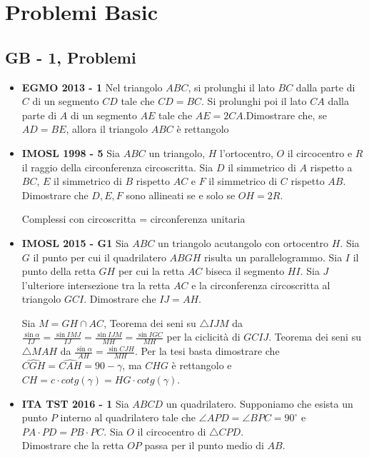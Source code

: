 \section{Problemi Basic}
\subsection{GB - 1, Problemi}
\begin{itemize}
 \item \textbf{EGMO 2013 - 1} Nel triangolo $ABC$, si prolunghi il lato $BC$ dalla parte di $C$ di un segmento $CD$ tale che $CD=BC$. Si prolunghi poi il lato $CA$ dalla parte di $A$ di un segmento $AE$ tale che $AE= 2CA$.Dimostrare che, se $AD=BE$, allora il triangolo $ABC$ è rettangolo
 
 \item \textbf{IMOSL 1998 - 5} Sia $ABC$ un triangolo, $H$ l'ortocentro, $O$ il circocentro e $R$ il raggio della circonferenza circoscritta. Sia $D$ il simmetrico di $A$ rispetto a $BC$, $E$ il simmetrico di $B$ rispetto $AC$ e $F$ il simmetrico di $C$ rispetto $AB$.\\
 Dimostrare che $D,E,F$ sono allineati se e solo se $OH=2R$.

 \begin{sol}
 Complessi con circoscritta = circonferenza unitaria
\end{sol}

 
 
 \item \textbf{IMOSL 2015 - G1} Sia $ABC$ un triangolo acutangolo con ortocentro $H$. Sia $G$ il punto per cui il quadrilatero $ABGH$ risulta un parallelogrammo. Sia $I$ il punto della retta $GH$ per cui
la retta $AC$ biseca il segmento $HI$. Sia $J$ l’ulteriore intersezione tra la retta $AC$ e la
circonferenza circoscritta al triangolo $GCI$.
Dimostrare che $IJ = AH$.

\begin{sol}
 Sia $M=GH\cap AC$, Teorema dei seni su $\triangle IJM$ da $\frac{\sin\alpha}{IJ}=\frac{\sin IMJ}{IJ}=\frac{\sin IJM}{MH}=\frac{\sin IGC}{MH}$ per la ciclicità di $GCIJ$. Teorema dei seni su $\triangle MAH$ da $\frac{\sin\alpha}{AH}=\frac{\sin CJH}{MH}$. Per la tesi basta dimostrare che $\widehat{CGH}=\widehat{CAH}=90-\gamma$, ma $CHG$ è rettangolo e $CH=c\cdot cotg(\gamma)=HG\cdot cotg(\gamma)$.
\end{sol}

\item \textbf{ITA TST 2016 - 1} Sia $ABCD$ un quadrilatero. Supponiamo che esista un punto $P$ interno al quadrilatero tale che $\angle APD = \angle BPC = 90^{\circ}$ e $PA \cdot PD = PB \cdot PC$. Sia $O$ il circocentro di $\triangle CPD$.\\
Dimostrare che la retta $OP$ passa per il punto medio di $AB$.
 
 \end{itemize}

